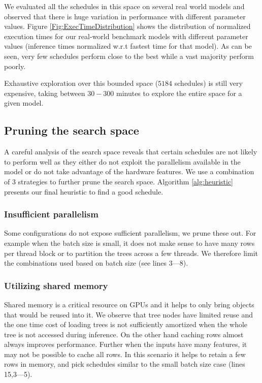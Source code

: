 We evaluated all the schedules in this space on several real world models and observed that 
there is huge variation in performance with different parameter values. 
Figure \ref{Fig:ExecTimeDistribution} shows the distribution of normalized execution times
for our real-world benchmark models with different parameter values (inference
times normalized w.r.t fastest time for that model).
As can be seen, very few schedules perform close to the best while a vast majority perform poorly.

Exhaustive exploration over this bounded space ($5184$ schedules) is still very expensive, taking
between $30-300$ minutes to explore the entire space for a given model. 

\subsection{Pruning the search space}
 
A careful analysis of the search space reveals that certain schedules are not likely to 
perform well as they either do not exploit the parallelism available in the model or do not take advantage of the hardware features.
We use a combination of 3 strategies to further prune the search space.
Algorithm \ref{alg:heuristic} presents our final heuristic to find a good schedule.

\subsubsection*{Insufficient parallelism}
 Some configurations do not expose sufficient parallelism, we prune these out.
  For example when the batch size is small, it does not make sense to have many rows
  per thread block or to partition the trees across a few threads. 
  We therefore limit the combinations used based on batch size (see lines 3---8).
\subsubsection*{Utilizing shared memory}
  Shared memory is a critical resource on GPUs and it helps to only bring objects that would be reused into it. 
  We observe that tree nodes have limited reuse and the one time cost of loading trees is not sufficiently amortized when the whole tree is not accessed during inference. 
  On the other hand caching rows 
  almost always improves performance. Further when the inputs have many features, it may not be possible to cache all rows.
  In this scenario it helps to retain a few rows in memory, and pick schedules similar to the small batch size case (lines 15,3---5).

